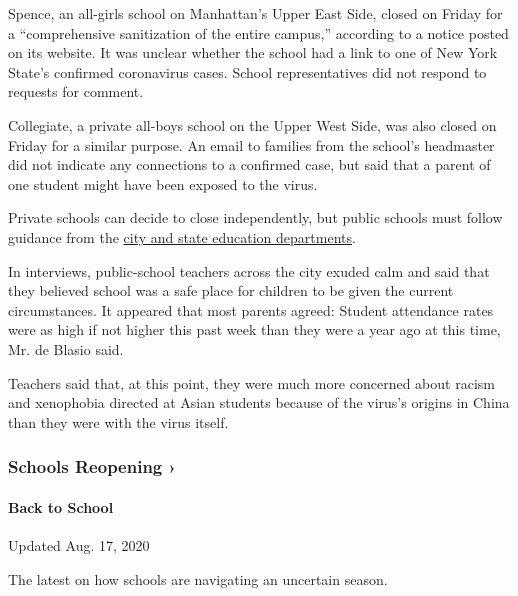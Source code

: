Spence, an all-girls school on Manhattan's Upper East Side, closed on
Friday for a ``comprehensive sanitization of the entire campus,''
according to a notice posted on its website. It was unclear whether the
school had a link to one of New York State's confirmed coronavirus
cases. School representatives did not respond to requests for comment.

Collegiate, a private all-boys school on the Upper West Side, was also
closed on Friday for a similar purpose. An email to families from the
school's headmaster did not indicate any connections to a confirmed
case, but said that a parent of one student might have been exposed to
the virus.

Private schools can decide to close independently, but public schools
must follow guidance from the
\href{https://www.nytimes.com/2020/03/08/nyregion/coronavirus-newyork.html}{city
and state education departments}.

In interviews, public-school teachers across the city exuded calm and
said that they believed school was a safe place for children to be given
the current circumstances. It appeared that most parents agreed: Student
attendance rates were as high if not higher this past week than they
were a year ago at this time, Mr. de Blasio said.

Teachers said that, at this point, they were much more concerned about
racism and xenophobia directed at Asian students because of the virus's
origins in China than they were with the virus itself.

\href{https://www.nytimes.com/spotlight/schools-reopening?action=click\&pgtype=Article\&state=default\&region=MAIN_CONTENT_3\&context=storylines_keepup}{}

\hypertarget{schools-reopening-}{%
\subsubsection{Schools Reopening ›}\label{schools-reopening-}}

\hypertarget{back-to-school}{%
\paragraph{Back to School}\label{back-to-school}}

Updated Aug. 17, 2020

The latest on how schools are navigating an uncertain season.

